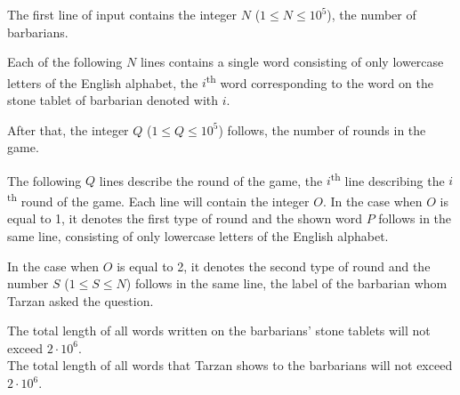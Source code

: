 \strut


The first line of input contains the integer $N$ ($1 \leqslant N \leqslant 10^5$), the number of barbarians.

Each of the following $N$ lines contains a single word consisting of only lowercase letters of the English alphabet, the $i$\textsuperscript{th} word corresponding to the word on the stone tablet of barbarian denoted with $i$.

After that, the integer $Q$ ($1 \leqslant Q \leqslant 10^5$) follows, the number of rounds in the game.

The following $Q$ lines describe the round of the game, the $i$\textsuperscript{th} line describing the $i$\textsuperscript{th} round of the game.
Each line will contain the integer $O$. In the case when $O$ is equal to 1, it denotes the first type of round and the shown word $P$ follows in the same line, consisting of only lowercase letters of the English alphabet.

In the case when $O$ is equal to 2, it denotes the second type of round and the number $S$ ($1 \leqslant S \leqslant N$) follows in the same line, the label of the barbarian whom Tarzan asked the question.

The total length of all words written on the barbarians' stone tablets will not exceed $2\cdot10^6$.\\
The total length of all words that Tarzan shows to the barbarians will not exceed $2\cdot10^6$.

